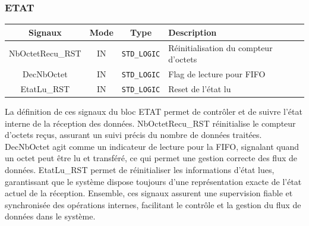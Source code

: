 \subsubsection*{ETAT}

\begin{center}
\renewcommand{\arraystretch}{1.2} %
\small %
    \begin{tabularx}{\textwidth}{|c||c|c|X|}
     \hline			
       \textbf{Signaux} & \textbf{Mode} & \textbf{Type} & \textbf{Description}  \\ \hline 
       NbOctetRecu\_RST & IN & \texttt{STD\_LOGIC} & Réinitialisation du compteur d’octets \\
       DecNbOctet & IN & \texttt{STD\_LOGIC} & Flag de lecture pour FIFO \\
       EtatLu\_RST & IN & \texttt{STD\_LOGIC} & Reset de l'état lu \\
     \hline  
    \end{tabularx}
\end{center}

La définition de ces signaux du bloc ETAT permet de contrôler et de suivre l’état interne de la réception des données. NbOctetRecu\_RST réinitialise le compteur d’octets reçus, assurant un suivi précis du nombre de données traitées. DecNbOctet agit comme un indicateur de lecture pour la FIFO, signalant quand un octet peut être lu et transféré, ce qui permet une gestion correcte des flux de données. EtatLu\_RST permet de réinitialiser les informations d’état lues, garantissant que le système dispose toujours d’une représentation exacte de l’état actuel de la réception. Ensemble, ces signaux assurent une supervision fiable et synchronisée des opérations internes, facilitant le contrôle et la gestion du flux de données dans le système.
\newline
